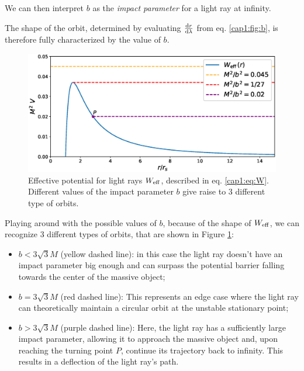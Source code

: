 We can then interpret $b$ as the \textit{impact parameter} for a light ray at
infinity.

The shape of the orbit, determined by evaluating $\dv{r}{\lambda}$ from eq.
\ref{cap1:fig:b}, is therefore fully characterized by the value of $b$.

\begin{figure}[h!]
    \centering
    \includegraphics[width = 0.8 \textwidth]{Figures/chapter1/W_eff_vs_b.eps}
    \caption{Effective potential for light rays $W_{\rm eff}$, described in eq.
        \ref{cap1:eq:W}.
        Different values of the impact parameter $b$ give raise to 3 different
        type of orbits.}
    \label{ca1:fig:W_eff_orbits}
\end{figure}

Playing around with the possible values of $b$, because of the shape of
$W_{\rm eff}$, we can recognize 3 different types of orbits, that are shown in
Figure \ref{ca1:fig:W_eff_orbits}:

\begin{itemize}
    \item $b < 3 \sqrt{3} M$ (yellow dashed line): in this case the light ray
        doesn't have an impact parameter big enough and can surpass the
        potential barrier falling towards the center of the massive object;
    \item $b = 3 \sqrt{3} M$ (red dashed line): This represents an edge case 
        where the light ray can theoretically maintain a circular orbit at the
        unstable stationary point;
    \item $b > 3 \sqrt{3} M$ (purple dashed line): Here, the light ray has a
        sufficiently large impact parameter, allowing it to approach the massive
        object and, upon reaching the turning point $P$, continue its trajectory
        back to infinity.
        This results in a deflection of the light ray's path.

        
\end{itemize}

